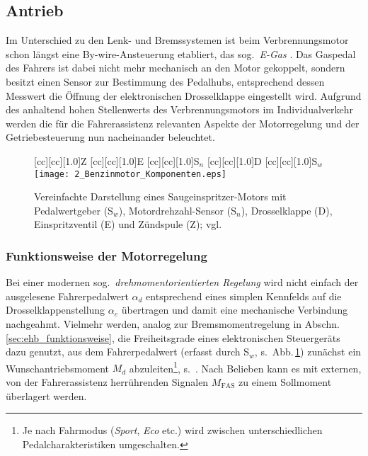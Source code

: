 \subsection{Antrieb} \label{sec:motorregelung}
Im Unterschied zu den Lenk- und Bremssystemen ist beim Verbrennungsmotor schon längst eine By-wire-Ansteuerung etabliert, das sog.\ \emph{E-Gas} \cite{isermann2010mechatronische}. Das Gaspedal des Fahrers ist dabei nicht mehr mechanisch an den Motor gekoppelt, sondern besitzt einen Sensor zur Bestimmung des Pedalhubs, entsprechend dessen Messwert die Öffnung der elektronischen Drosselklappe eingestellt wird. Aufgrund des anhaltend hohen Stellenwerts des Verbrennungsmotors im Individualverkehr werden die für die Fahrerassistenz relevanten Aspekte der Motorregelung und der Getriebesteuerung nun nacheinander beleuchtet.  

\begin{figure}[h]
	[cc][cc][1.0]{Z}
	[cc][cc][1.0]{E}
	[cc][cc][1.0]{S$_n$}
	[cc][cc][1.0]{D}
	[cc][cc][1.0]{S$_w$}
\centering
\texttt{[image: 2\_Benzinmotor\_Komponenten.eps]}
 \caption[Vereinfachte Darstellung eines Saugeinspritzer-Motors]{Vereinfachte Darstellung eines Saugeinspritzer-Motors mit Pedalwertgeber (S$_w$), Motordrehzahl-Sensor (S$_n$), Drosselklappe (D), Einspritzventil (E) und Zündspule (Z); vgl. \cite{isermann2010mechatronische}}
 \label{fig:motor_aufbau}
\end{figure} 


\subsubsection{Funktionsweise der Motorregelung}
Bei einer modernen sog.\ \emph{drehmomentorientierten Regelung} \cite{patentDE19812485B4, patentDE69007902T2} wird nicht einfach der ausgelesene Fahrerpedalwert $\alpha_d$ entsprechend eines simplen Kennfelds auf die Drosselklappenstellung $\alpha_e$ übertragen und damit eine mechanische Verbindung nachgeahmt. Vielmehr werden, analog zur Bremsmomentregelung in Abschn.\,\ref{sec:ehb_funktionsweise}, die Freiheitsgrade eines elektronischen Steuergeräts dazu genutzt, aus dem Fahrerpedalwert (erfasst durch S$_w$, s.\ Abb.\,\ref{fig:motor_aufbau}) zunächst ein Wunschantriebsmoment $M_d$ abzuleiten\footnote{Je nach Fahrmodus (\emph{Sport}, \emph{Eco} etc.) wird zwischen unterschiedlichen Pedalcharakteristiken umgeschalten.}, s.\ . Nach Belieben kann es mit externen, \zB von der  Fahrerassistenz herrührenden Signalen $M_\text{FAS}$ zu einem Sollmoment überlagert werden. %

